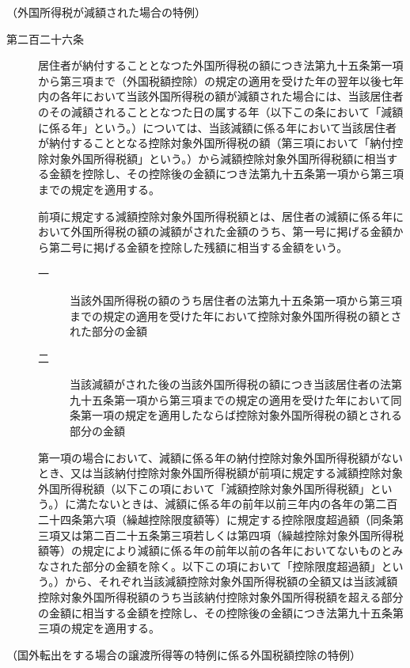 \documentclass[twocolumn,a4j,10pt]{ltjtarticle}
\begin{document}
\noindent\hspace{10pt}（外国所得税が減額された場合の特例）
\begin{description}
\item[第二百二十六条]居住者が納付することとなつた外国所得税の額につき法第九十五条第一項から第三項まで（外国税額控除）の規定の適用を受けた年の翌年以後七年内の各年において当該外国所得税の額が減額された場合には、当該居住者のその減額されることとなつた日の属する年（以下この条において「減額に係る年」という。）については、当該減額に係る年において当該居住者が納付することとなる控除対象外国所得税の額（第三項において「納付控除対象外国所得税額」という。）から減額控除対象外国所得税額に相当する金額を控除し、その控除後の金額につき法第九十五条第一項から第三項までの規定を適用する。
\item[]前項に規定する減額控除対象外国所得税額とは、居住者の減額に係る年において外国所得税の額の減額がされた金額のうち、第一号に掲げる金額から第二号に掲げる金額を控除した残額に相当する金額をいう。
\begin{description}
\item[一]当該外国所得税の額のうち居住者の法第九十五条第一項から第三項までの規定の適用を受けた年において控除対象外国所得税の額とされた部分の金額
\item[二]当該減額がされた後の当該外国所得税の額につき当該居住者の法第九十五条第一項から第三項までの規定の適用を受けた年において同条第一項の規定を適用したならば控除対象外国所得税の額とされる部分の金額
\end{description}
\item[]第一項の場合において、減額に係る年の納付控除対象外国所得税額がないとき、又は当該納付控除対象外国所得税額が前項に規定する減額控除対象外国所得税額（以下この項において「減額控除対象外国所得税額」という。）に満たないときは、減額に係る年の前年以前三年内の各年の第二百二十四条第六項（繰越控除限度額等）に規定する控除限度超過額（同条第三項又は第二百二十五条第三項若しくは第四項（繰越控除対象外国所得税額等）の規定により減額に係る年の前年以前の各年においてないものとみなされた部分の金額を除く。以下この項において「控除限度超過額」という。）から、それぞれ当該減額控除対象外国所得税額の全額又は当該減額控除対象外国所得税額のうち当該納付控除対象外国所得税額を超える部分の金額に相当する金額を控除し、その控除後の金額につき法第九十五条第三項の規定を適用する。
\end{description}
\noindent\hspace{10pt}（国外転出をする場合の譲渡所得等の特例に係る外国税額控除の特例）
\end{document}
